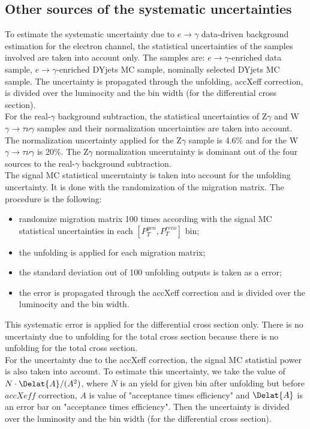 \subsection{Other sources of the systematic uncertainties}

To estimate the systematic uncertainty due to $e\rightarrow\gamma$ data-driven background estimation for the electron channel, the statistical uncertainties of the samples involved are taken into account only. The samples are: $e\rightarrow\gamma$-enriched data sample, $e\rightarrow\gamma$-enriched DYjets MC sample, nominally selected DYjets MC sample. The uncertainty is propagated through the unfolding, accXeff correction, is divided over the luminocity and the bin width (for the differential cross section).\\

For the real-$\gamma$ background subtraction, the statistical uncertainties of Z$\gamma$ and W$\gamma\rightarrow\tau\nu\gamma$ samples and their normalization uncertainties are taken into account. The normalization uncertainty applied for the Z$\gamma$ sample is 4.6\% and for the W$\gamma\rightarrow\tau\nu\gamma$ is 20\%. The Z$\gamma$ normalization uncerntainty is dominant out of the four sources to the real-$\gamma$ background subtraction.\\

The signal MC statistical uncerntainty is taken into account for the unfolding uncertainty. It is done with the randomization of the migration matrix. The procedure is the following:\\
\begin{itemize}
  \item randomize migration matrix 100 times according with the signal MC statistical uncertainties in each $[P_T^{gen},P_T^{reco}]$ bin;
  \item the unfolding is applied for each migration matrix;
  \item the standard deviation out of 100 unfolding outputs is taken as a error;
  \item the error is propagated through the accXeff correction and is divided over the luminocity and the bin width.
\end{itemize}
This systematic error is applied for the differential cross section only. There is no uncertainty due to unfolding for the total cross section because there is no unfolding for the total cross section.\\

For the uncertainty due to the accXeff correction, the signal MC statistial power is also taken into account. To estimate this uncertainty, we take the value of $N \cdot \Delat{A} / (A^2)$, where $N$ is an yield for given bin after unfolding but before $accXeff$ correction, $A$ is value of "acceptance times efficiency" and $\Delat{A}$ is an error bar on "acceptance times efficiency". Then the uncertainty is divided over the luminosity and the bin width (for the differential cross section).\\


